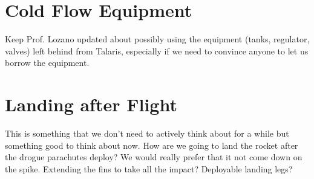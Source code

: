 \documentclass[12pt]{article}
\begin{document}
\section{Cold Flow Equipment}
Keep Prof. Lozano updated about possibly using the equipment (tanks, regulator, valves) left behind from Talaris, especially if we need to convince anyone to let us borrow the equipment.

\section{Landing after Flight}
This is something that we don't need to actively think about for a while but something good to think about now. How are we going to land the rocket after the drogue parachutes deploy? We would really prefer that it not come down on the spike. Extending the fins to take all the impact? Deployable landing legs?
\end{document}
